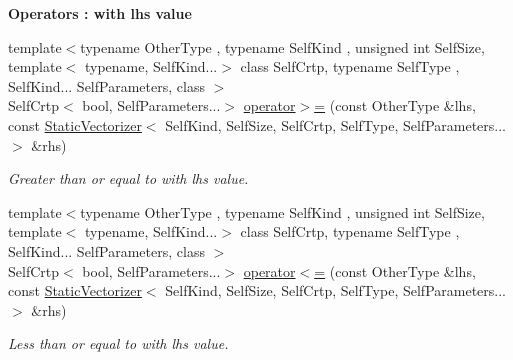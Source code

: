 \begin{Indent}{\bf Operators \-: with lhs value}
\begin{DoxyCompactItemize}
{\footnotesize template$<$typename Other\-Type , typename Self\-Kind , unsigned int Self\-Size, template$<$ typename, Self\-Kind...$>$ class Self\-Crtp, typename Self\-Type , Self\-Kind... Self\-Parameters, class $>$ }\\Self\-Crtp$<$ bool, Self\-Parameters...$>$ \hyperlink{classmagrathea_1_1StaticVectorizer_a7eff4653f0b8a216af1547f5094980a1}{operator$>$=} (const Other\-Type \&lhs, const \hyperlink{classmagrathea_1_1StaticVectorizer}{Static\-Vectorizer}$<$ Self\-Kind, Self\-Size, Self\-Crtp, Self\-Type, Self\-Parameters...$>$ \&rhs)
\begin{DoxyCompactList}\small\item\em Greater than or equal to with lhs value. \end{DoxyCompactList}\item 
{\footnotesize template$<$typename Other\-Type , typename Self\-Kind , unsigned int Self\-Size, template$<$ typename, Self\-Kind...$>$ class Self\-Crtp, typename Self\-Type , Self\-Kind... Self\-Parameters, class $>$ }\\Self\-Crtp$<$ bool, Self\-Parameters...$>$ \hyperlink{classmagrathea_1_1StaticVectorizer_a56bd8400d219fc4e39c5973a1db97c71}{operator$<$=} (const Other\-Type \&lhs, const \hyperlink{classmagrathea_1_1StaticVectorizer}{Static\-Vectorizer}$<$ Self\-Kind, Self\-Size, Self\-Crtp, Self\-Type, Self\-Parameters...$>$ \&rhs)
\begin{DoxyCompactList}\small\item\em Less than or equal to with lhs value. \end{DoxyCompactList}\end{DoxyCompactItemize}
\end{Indent}
